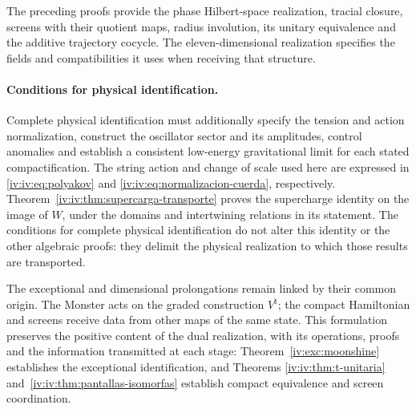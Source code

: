 The preceding proofs provide the phase Hilbert-space
realization, tracial closure, screens
with their quotient maps, radius involution,
its unitary equivalence and the additive trajectory
cocycle. The eleven-dimensional realization
specifies the fields and compatibilities it
uses when receiving that structure.

\paragraph{Conditions for physical identification.}
\label{iv:iv:condiciones-realizacion-fisica}
Complete physical identification must additionally
specify the tension and action normalization,
construct the oscillator sector and its amplitudes,
control anomalies and establish a consistent
low-energy gravitational limit for each stated
compactification.
The string action and change of scale used here
are expressed in \eqref{iv:iv:eq:polyakov}
and \eqref{iv:iv:eq:normalizacion-cuerda}, respectively.
Theorem~\ref{iv:iv:thm:supercarga-transporte}
proves the supercharge identity on the image of
\(W\), under the domains and intertwining relations
in its statement. The conditions for complete physical
identification do not alter this identity or the other
algebraic proofs: they delimit the physical realization
to which those results are transported.

The exceptional and dimensional prolongations
remain linked by their common origin. The
Monster acts on the graded construction
\(V^\natural\); the compact Hamiltonian and
screens receive data from other maps of the
same state. This formulation preserves the
positive content of the dual realization,
with its operations, proofs and the information
transmitted at each stage: Theorem~\ref{iv:exc:moonshine}
establishes the exceptional identification, and Theorems
\ref{iv:iv:thm:t-unitaria} and~\ref{iv:iv:thm:pantallas-isomorfas}
establish compact equivalence and screen coordination.
